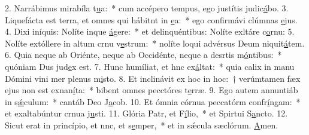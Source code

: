 2. Narrábimus mirabíla t\uline{u}a:~* cum accépero tempus, ego justítis judic\uline{á}bo.
3. Liquefácta est terra, et omnes qui hábitnt in \uline{e}a:~* ego confirmávi clúmnas \uline{e}jus.
4. Dixi iníquis: Nolíte inque \uline{á}gere:~* et delinquéntibus: Nolíte exltáre c\uline{o}rnu:
5. Nolíte extóllere in altum crnu v\uline{e}strum:~* nolíte loqui advérsus Deum niquit\uline{á}tem.
6. Quia neque ab Oriénte, neque ab Occidénte, neque a desrtis m\uline{ó}ntibus:~* quóniam Dus jud\uline{e}x est.
7. Hunc humíliat, et hnc ex\uline{á}ltat:~* quia calix in manu Dómini vini mer plenus m\uline{i}sto.
8. Et inclinávit ex hoc in hoc:~† verúmtamen fæx ejus non est exnan\uline{í}ta:~* bibent omnes pecctóres t\uline{e}rræ.
9. Ego autem annuntiáb in s\uline{ǽ}culum:~* cantáb Deo J\uline{a}cob.
10. Et ómnia córnua peccatórm confr\uline{í}ngam:~* et exaltabúntur crnua j\uline{u}sti.
11. Glória Patr, et F\uline{í}lio,~* et Spirtui S\uline{a}ncto.
12. Sicut erat in princípio, et nnc, et s\uline{e}mper,~* et in sǽcula sæclórum. \uline{A}men.
